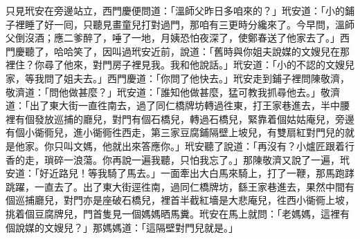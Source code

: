 只見玳安在旁邊站立，西門慶便問道：「溫師父昨日多咱來的？」玳安道：「小的鋪子裡睡了好一囘，只聽見畫童兒打對過門，那咱有三更時分纔來了。今早問，溫師父倒沒酒；應二爹醉了，唾了一地，月姨恐怕夜深了，使鄭春送了他家去了。」西門慶聽了，哈哈笑了，因叫過玳安近前，說道：「舊時與你姐夫說媒的文嫂兒在那裡住？你尋了他來，對門房子裡見我。我和他說話。」玳安道：「小的不認的文嫂兒家，等我問了姐夫去。」西門慶道：「你問了他快去。」玳安走到鋪子裡問陳敬濟，敬濟道：「問他做甚麼？」玳安道：「誰知他做甚麼，猛可教我抓尋他去。」{}敬濟道：「出了東大街一直徃南去，過了同仁橋牌坊轉過徃東，打王家巷進去，半中腰裡有個發放巡捕的廳兒，對門有個石橋兒，轉過石橋兒，緊靠着個姑姑庵兒，旁邊有個小衚衕兒，進小衚衕徃西走，第三家豆腐鋪隔壁上坡兒，有雙扇紅對門兒的就是他家。你只叫文媽，他就出來答應你。」玳安聽了說道：「再沒有？小爐匠跟着行香的走，瑣碎一浪蕩。你再說一遍我聽，{}只怕我忘了。」那陳敬濟又說了一遍，玳安道：「好近路兒！等我騎了馬去。」一面牽出大白馬來騎上，打了一鞭，那馬跑踍跳躍，一直去了。出了東大街逕徃南，過同仁橋牌坊，繇王家巷進去，果然中間有個巡捕廳兒，對門亦是座破石橋兒，裡首半截紅墻是大悲庵兒，徃西小衚衕上坡，挑着個豆腐牌兒，門首隻見一個媽媽晒馬糞。玳安在馬上就問：「老媽媽，這裡有個說媒的文嫂兒？」那媽媽道：「這隔壁對門兒就是。」

